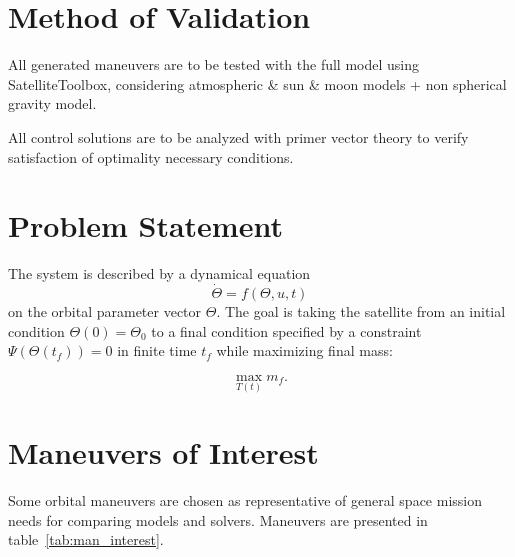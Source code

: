 \section{Method of Validation}

All generated maneuvers are to be tested with the full model using SatelliteToolbox, considering atmospheric \& sun \& moon models + non spherical gravity model.

All control solutions are to be analyzed with primer vector theory to verify satisfaction of optimality necessary conditions.

\section{Problem Statement}

The system is described by a dynamical equation
\begin{equation} \label{eq:dynamics}
    \dot \Theta = f(\Theta, u, t)
\end{equation}
on the orbital parameter vector \(\Theta\). The goal is taking the satellite from an initial condition \(\Theta(0) = \Theta_0\) to a final condition specified by a constraint \(\Psi(\Theta(t_f)) = 0\) in finite time \(t_f\) while maximizing final mass:

\begin{equation} \label{eq:max_m}
    \max_{T(t)} m_f.
\end{equation}

\section{Maneuvers of Interest}

Some orbital maneuvers are chosen as representative of general space mission needs for comparing models and solvers. Maneuvers are presented in table~\ref{tab:man_interest}. 

